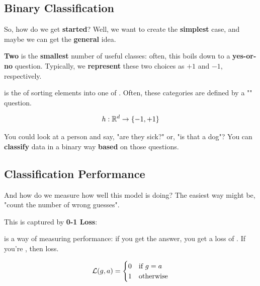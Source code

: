     \subsection{Binary Classification}
    
        So, how do we get \textbf{started}? Well, we want to create the \textbf{simplest} case, and maybe we can get the \textbf{general} idea.
        
        \textbf{Two} is the \textbf{smallest} number of useful classes: often, this boils down to a \textbf{yes-or-no} question. Typically, we \textbf{represent} these two choices as $+1$ and $-1$, respectively.\\
        
        \begin{definition}
             is the  of sorting elements into one of . Often, these categories are defined by a "" question.
            
            \begin{equation*}
                h: \mathbb R^d \rightarrow \{-1,+1\}
            \end{equation*}
        \end{definition}
        
        \miniex You could look at a person and say, "are they sick?" or, "is that a dog"? You can \textbf{classify} data in a binary way \textbf{based} on those questions.
        
    \subsection{Classification Performance}
        
        And how do we measure how well this model is doing? The easiest way might be, "count the number of wrong guesses".
        
        This is captured by \textbf{0-1 Loss}:\\
        
        \begin{definition}
             is a way of measuring  performance: if you get the  answer, you get a loss of . If you're , then  loss. 
            
            \begin{equation*}
                \mathcal{L}(g, a) = 
                \begin{cases}
                     0 & \text{if $g = a$} \\
                     1 & \text{otherwise}
                \end{cases}
            \end{equation*}
        \end{definition}
        
